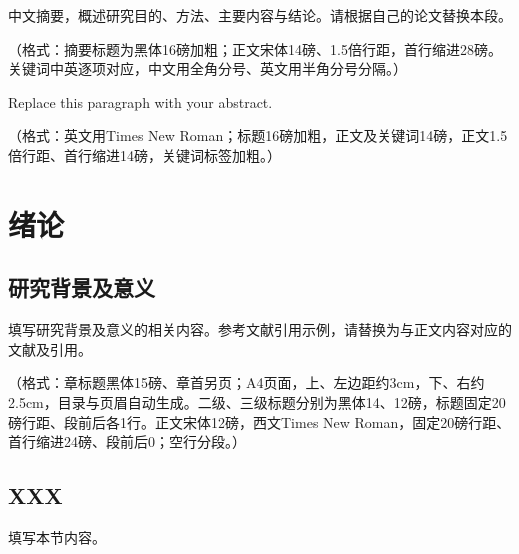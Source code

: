 \documentclass{研究生大论文模板}
\begin{document}
\makecover
\makeauthorization

\begin{chineseabstract}
中文摘要，概述研究目的、方法、主要内容与结论。请根据自己的论文替换本段。

（格式：摘要标题为黑体16磅加粗；正文宋体14磅、1.5倍行距，首行缩进28磅。关键词中英逐项对应，中文用全角分号、英文用半角分号分隔。）
\end{chineseabstract}

\begin{englishabstract}
Replace this paragraph with your abstract.

（格式：英文用Times New Roman；标题16磅加粗，正文及关键词14磅，正文1.5倍行距、首行缩进14磅，关键词标签加粗。）
\end{englishabstract}

\thesistableofcontents
\mainmatter

\section{绪论}
\subsection{研究背景及意义}
填写研究背景及意义的相关内容。参考文献引用示例\cite{korn,drachman,zhang,pu}，请替换为与正文内容对应的文献及引用。

（格式：章标题黑体15磅、章首另页；A4页面，上、左边距约3cm，下、右约2.5cm，目录与页眉自动生成。二级、三级标题分别为黑体14、12磅，标题固定20磅行距、段前后各1行。正文宋体12磅，西文Times New Roman，固定20磅行距、首行缩进24磅、段前后0；空行分段。）

\subsection{XXX}
填写本节内容。
\end{document}
